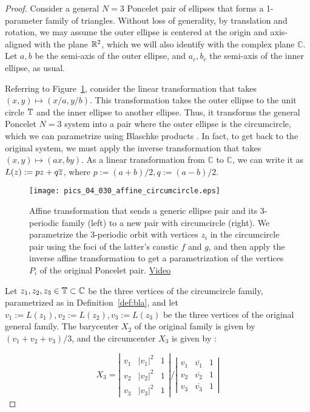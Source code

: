 \begin{proof}
Consider a general $N=3$ Poncelet pair of ellipses that forms a 1-parameter family of triangles. Without loss of generality, by translation and rotation, we may assume the outer ellipse is centered at the origin and axis-aligned with the plane $\mathbb{R}^2$, which we will also identify with the complex plane $\mathbb{C}$. Let $a,b$ be the semi-axis of the outer ellipse, and $a_c,b_c$ the semi-axis of the inner ellipse, as usual. 

Referring to Figure~\ref{fig:affine}, consider the linear transformation that takes $(x,y)\mapsto(x/a,y/b)$. This transformation takes the outer ellipse to the unit circle $\mathbb{T}$ and the inner ellipse to another ellipse. Thus, it transforms the general Poncelet $N=3$ system into a pair where the outer ellipse is the circumcircle, which we can parametrize using Blaschke products \cite{daepp-2019}. In fact, to get back to the original system, we must apply the inverse transformation that takes $(x,y)\mapsto(a x,b y)$. As a linear transformation from $\mathbb{C}$ to $\mathbb{C}$, we can write it as $L(z):=p z+q \overline{z}$, where $p:=(a+b)/2, q:=(a-b)/2$.

\begin{figure}
    \centering
    \texttt{[image: pics\_04\_030\_affine\_circumcircle.eps]}
    \caption{Affine transformation that sends a generic ellipse pair and its 3-periodic family (left) to a new pair with circumcircle (right). We parametrize the 3-periodic orbit with vertices $z_i$ in the circumcircle pair using the foci of the latter's caustic $f$ and $g$, and then apply the inverse affine transformation to get a parametrization of the vertices $P_i$ of the original Poncelet pair. \href{https://youtu.be/6xSFBLWIkTM}{Video}}
    \label{fig:affine}
\end{figure}


Let $z_1,z_2,z_3\in\mathbb{T}\subset\mathbb{C}$ be the three vertices of the circumcircle family, parametrized as in Definition~\ref{def:bla}, and let $v_1:=L(z_1),v_2:=L(z_2),v_3:=L(z_3)$ be the three vertices of the original general family. The barycenter $X_2$ of the original family is given by $(v_1+v_2+v_3)/3$, and the circumcenter $X_3$ is given by \cite{stackexchange-x3a}:

\[
    X_3=\left|
        \begin{array}{ccc}
          v_1 & |v_1|^2 & 1 \\
          v_2 & |v_2|^2 & 1 \\
          v_3 & |v_3|^2 & 1
        \end{array}
      \right| \Bigg/
     \left|
        \begin{array}{ccc}
          v_1 & \overline{v_1} & 1 \\
          v_2 & \overline{v_2} & 1 \\
          v_3 & \overline{v_3} & 1
        \end{array}
      \right|
\]


\end{proof}

